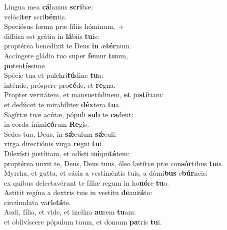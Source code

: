 \evenverse Lingua mea \textbf{cá}lamus \textbf{scri}bæ:~\*\\
\evenverse velóci\textbf{ter} scri\textbf{bén}tis.\\
\oddverse Speciósus forma præ fíliis hóminum,~+\\
\oddverse  diffúsa est grátia in \textbf{lá}biis \textbf{tu}is:~\*\\
\oddverse proptérea benedíxit te Deus \textbf{in} æ\textbf{tér}num.\\
\evenverse Accíngere gládio tuo super \textbf{fe}mur \textbf{tu}um,~\*\\
\evenverse \textbf{po}ten\textbf{tís}sime.\\
\oddverse Spécie tua et pulchri\textbf{tú}dine \textbf{tu}a:~\*\\
\oddverse inténde, próspere pro\textbf{cé}de, et \textbf{re}gna.\\
\evenverse Propter veritátem, et mansuetúdinem, \textbf{et} ju\textbf{stí}tiam:~\*\\
\evenverse et dedúcet te mirabíliter \textbf{déx}tera \textbf{tu}a.\\
\oddverse Sagíttæ tuæ acútæ, pópuli \textbf{sub} te \textbf{ca}dent:~\*\\
\oddverse in corda inimi\textbf{có}rum \textbf{Re}gis.\\
\evenverse Sedes tua, Deus, in \textbf{sǽ}culum \textbf{sǽ}culi:~\*\\
\evenverse virga directiónis virga \textbf{re}gni \textbf{tu}i.\\
\oddverse Dilexísti justítiam, et odísti i\textbf{ni}qui\textbf{tá}tem:~\*\\
\oddverse proptérea unxit te, Deus, Deus tuus, óleo lætítiæ præ con\textbf{sór}tibus \textbf{tu}is.\\
\evenverse Myrrha, et gutta, et cásia a vestiméntis tuis, a dómi\textbf{bus} e\textbf{búr}neis:~\*\\
\evenverse ex quibus delectavérunt te fíliæ regum in ho\textbf{nó}re \textbf{tu}o.\\
\oddverse Astitit regína a dextris tuis in vestítu \textbf{de}au\textbf{rá}to:~\*\\
\oddverse circúmdata va\textbf{ri}e\textbf{tá}te.\\
\evenverse Audi, fília, et vide, et inclína \textbf{au}rem \textbf{tu}am:~\*\\
\evenverse et oblivíscere pópulum tuum, et domum \textbf{pa}tris \textbf{tu}i.\\
